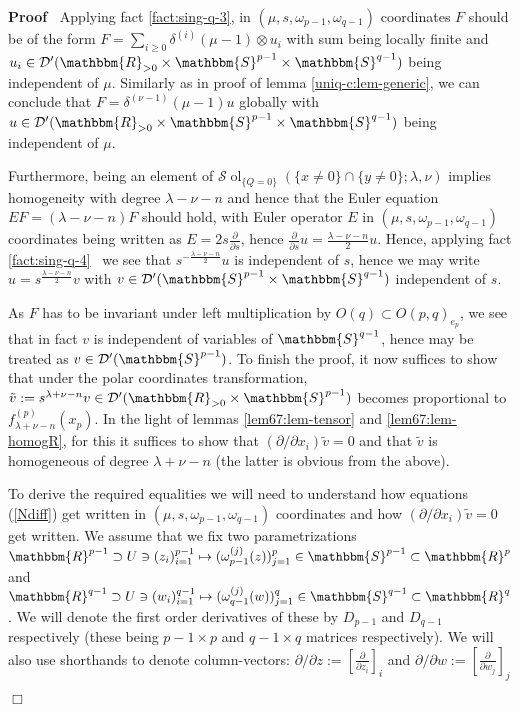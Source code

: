 \documentclass{article}
\newcommand{\assign}{:=}
\newcommand{\tmop}[1]{\ensuremath{\operatorname{#1}}}
\renewenvironment{proof}{\noindent\textbf{Proof\ }}{\hspace*{\fill}$\Box$\medskip}
\theoremstyle{remark}
\newcommand{\D}{\mathcal{D}}
\newcommand{\Sp}{\mathbbm{S}}
\newcommand{\R}{\mathbbm{R}}
\begin{document}
\begin{proof}
  Applying fact \ref{fact:sing-q-3}, in $(\mu, s, \omega_{p - 1}, \omega_{q -
  1})$ coordinates $F$ should be of the form $F = \sum_{i \geq 0} \delta^{(i)}
  (\mu - 1) \otimes u_i$ with sum being locally finite and $u_i \in \D'
  (\R_{> 0} \times \Sp^{p - 1} \times \mathbbm{S}^{q - 1})$ being independent
  of $\mu$. Similarly as in proof of lemma \ref{uniq-c:lem-generic}, we can
  conclude that $F = \delta^{(\nu - 1)}  (\mu - 1) u$ globally with $u \in \D'
  (\R_{> 0} \times \mathbbm{S}^{p - 1} \times \mathbbm{S}^{q - 1})$ being
  independent of $\mu$.
  
  Furthermore, being an element of $\mathcal{S} \tmop{ol}_{\{ Q = 0 \}} (\{ x
  \neq 0 \} \cap \{ y \neq 0 \} ; \lambda, \nu)$ implies homogeneity with
  degree $\lambda - \nu - n$ and hence that the Euler equation $EF = (\lambda
  - \nu - n) F$ should hold, with Euler operator $E$ in $(\mu, s, \omega_{p -
  1}, \omega_{q - 1})$ coordinates being written as $E = 2 s
  \frac{\partial}{\partial s}$, hence $\frac{\partial}{\partial s} u =
  \frac{\lambda - \nu - n}{2} u$. Hence, applying fact \ref{fact:sing-q-4} \
  we see that $s^{- \frac{\lambda - \nu - n}{2}} u$ is independent of $s$,
  hence we may write $u = s^{\frac{\lambda - \nu - n}{2}} v$ with $v \in \D'
  (\mathbbm{S}^{p - 1} \times \mathbbm{S}^{q - 1})$ independent of $s$.
  
  As $F$ has to be invariant under left multiplication by $O (q) \subset O (p,
  q)_{e_p}$, we see that in fact $v$ is independent of variables of
  $\mathbbm{S}^{q - 1}$, hence may be treated as $v \in \D' (\mathbbm{S}^{p -
  1})$. To finish the proof, it now suffices to show that under the polar
  coordinates transformation, $\tilde{v} \assign s^{\lambda + \nu - n} v \in
  \D' (\R_{> 0} \times \mathbbm{S}^{p - 1})$ becomes proportional to
  $f_{\lambda + \nu - n}^{(p)} (x_p)$. In the light of lemmas
  \ref{lem67:lem-tensor} and \ref{lem67:lem-homogR}, for this it suffices to
  show that $(\partial / \partial x_i)  \tilde{v} = 0$ and that $\tilde{v}$ is
  homogeneous of degree $\lambda + \nu - n$ (the latter is obvious from the
  above).
  
  To derive the required equalities we will need to understand how equations
  (\ref{Ndiff}) get written in $(\mu, s, \omega_{p - 1}, \omega_{q - 1})$
  coordinates and how $(\partial / \partial x_i)  \tilde{v} = 0$ get written.
  We assume that we fix two parametrizations $\R^{p - 1} \supset U \ni
  (z_i)_{i = 1}^{p - 1} \mapsto (\omega_{p - 1}^{(j)} (z))_{j = 1}^p \in
  \mathbbm{S}^{p - 1} \subset \R^p$ and $\R^{q - 1} \supset U \ni (w_i)_{i =
  1}^{q - 1} \mapsto (\omega_{q - 1}^{(j)} (w))_{j = 1}^q \in \mathbbm{S}^{q -
  1} \subset \R^q$. We will denote the first order derivatives of these by
  $D_{p - 1}$ and $D_{q - 1}$ respectively (these being $p - 1 \times p$ and
  $q - 1 \times q$ matrices respectively). We will also use shorthands to
  denote column-vectors: $\partial / \partial z \assign \left[
  \frac{\partial}{\partial z_i} \right]_i$ and $\partial / \partial w \assign
  \left[ \frac{\partial}{\partial w_j} \right]_j$
  

\end{proof}
\end{document}
